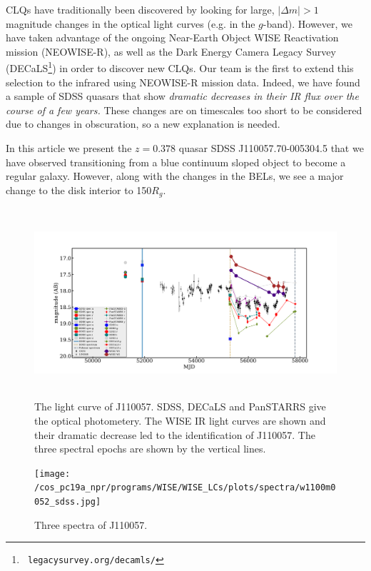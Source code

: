 \documentclass{nature}
\begin{document}
CLQs have traditionally been discovered by looking for large, $|
\Delta m | >1$ magnitude changes in the optical light curves (e.g. in
the $g$-band). However, we have taken advantage of the ongoing
Near-Earth Object WISE Reactivation mission
(NEOWISE-R)\cite{Mainzer14, Meisner17, Meisner17b}, as well as the
Dark Energy Camera Legacy Survey (DECaLS\footnote{{\tt
legacysurvey.org/decamls/}}) in order to discover new CLQs. Our team
is the first to extend this selection to the infrared using NEOWISE-R
mission data. Indeed, we have found a sample of SDSS quasars that show
{\it dramatic decreases in their IR flux over the course of a few
years.}  These changes are on timescales too short to be considered
due to changes in obscuration, so a new explanation is needed.

In this article we present the $z=0.378$ quasar SDSS
J110057.70-005304.5 that we have observed transitioning from a blue
continuum sloped object to become a regular galaxy. However, along
with the changes in the BELs, we see a major change to the disk
interior to 150$R_{g}$.
 
\begin{figure}
  \centering
  \includegraphics[width=16.00cm, height=7.00cm, trim=0.0cm 0.0cm 0.0cm 0.0cm, clip]
  {../plots/lc/J110057_lc_20171006v1.pdf}
  \caption[]{The light curve of J110057. SDSS, DECaLS and PanSTARRS
    give the optical photometery. The WISE IR light curves are shown and
    their dramatic decrease led to the identification of J110057. The
    three spectral epochs are shown by the vertical lines.}
  \label{fig:J110057_LC_CRTS}
\end{figure}

\begin{figure}
  \texttt{[image: /cos\_pc19a\_npr/programs/WISE/WISE\_LCs/plots/spectra/w1100m0052\_sdss.jpg]}
  \centering
  \caption[]{Three spectra of J110057. }
  \label{fig:J110057_spectra}
\end{figure}
\end{document}
